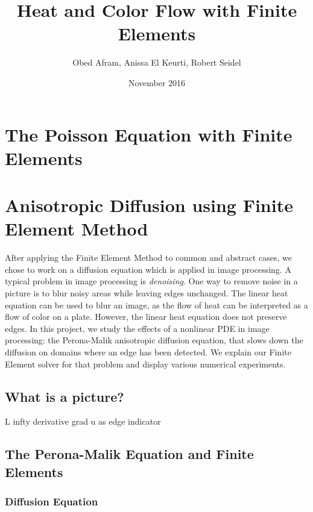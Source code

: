 \documentclass{report}
\begin{document}

\lstset{language=Matlab}

\title{Heat and Color Flow with Finite Elements}
\author{Obed Afram, Anissa El Keurti, Robert Seidel}
\date{November 2016}
\maketitle

\chapter{The Poisson Equation with Finite Elements}

\chapter{Anisotropic Diffusion using Finite Element Method}

After applying the Finite Element Method to common and abstract cases, we chose to work on a diffusion equation which is applied in image processing. A typical problem in image processing is \emph{denoising}. One way to remove noise in a picture is to blur noisy areas while leaving edges unchanged. The linear heat equation can be used to blur an image, as the flow of heat can be interpreted as a flow of color on a plate. However, the linear heat equation does not preserve edges. In this project, we study the effects of a nonlinear PDE in image processing: the Perona-Malik anisotropic diffusion equation, that slows down the diffusion on domains where an edge has been detected. We explain our Finite Element solver for that problem and display various numerical experiments.

\section{What is a picture?}

L infty
derivative
grad u as edge indicator

\section{The Perona-Malik Equation and Finite Elements}

\subsection{Diffusion Equation}
\end{document}
